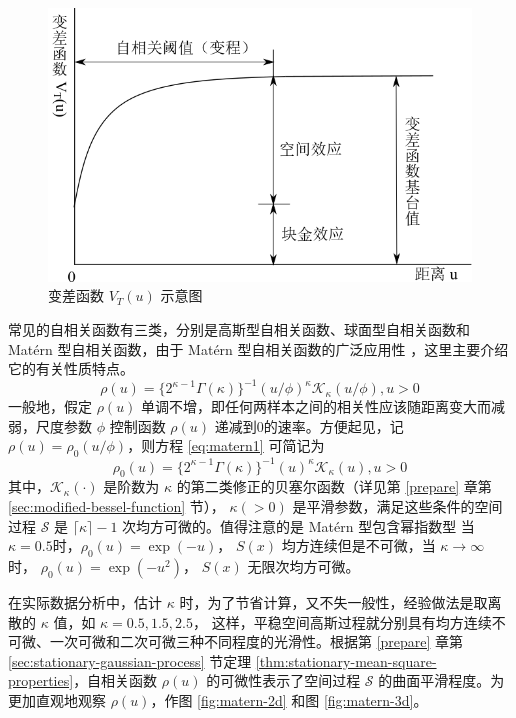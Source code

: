 \documentclass[12pt,a4paper,UTF8,twoside]{book}
\theoremstyle{definition}
\theoremstyle{definition}
\theoremstyle{definition}
\theoremstyle{remark}
\begin{document}
\begin{figure}

{\centering \includegraphics[width=0.7\linewidth]{figures/semi-variance} 

}

\caption{变差函数 $V_{T}(u)$ 示意图}\label{fig:semi-variance}
\end{figure}

常见的自相关函数有三类，分别是高斯型自相关函数、球面型自相关函数和
Matérn 型自相关函数，由于 Matérn 型自相关函数的广泛应用性
\citep{Diggle1998, Diggle2002Childhood, Christensen2004}，这里主要介绍它的有关性质特点。
\begin{equation}
\rho(u)=\{2^{\kappa -1}\Gamma(\kappa)\}^{-1}(u/\phi)^{\kappa}\mathcal{K}_{\kappa}(u/\phi),u > 0 \label{eq:matern1}
\end{equation} \noindent 一般地，假定 \(\rho(u)\)
单调不增，即任何两样本之间的相关性应该随距离变大而减弱，尺度参数
\(\phi\) 控制函数 \(\rho(u)\) 递减到0的速率。方便起见，记
\(\rho(u) = \rho_{0}(u/\phi)\)，则方程 \eqref{eq:matern1} 可简记为
\begin{equation}
\rho_{0}(u)=\{2^{\kappa -1}\Gamma(\kappa)\}^{-1}(u)^{\kappa}\mathcal{K}_{\kappa}(u),u > 0 \label{eq:matern2}
\end{equation} \noindent 其中，\(\mathcal{K}_{\kappa}(\cdot)\) 是阶数为
\(\kappa\) 的第二类修正的贝塞尔函数（详见第 \ref{prepare}
章第\ref{sec:modified-bessel-function} 节）， \(\kappa(>0)\)
是平滑参数，满足这些条件的空间过程 \(\mathcal{S}\) 是
\(\lceil\kappa\rceil-1\) 次均方可微的。值得注意的是 Matérn
型包含幂指数型 \noindent 当
\(\kappa = 0.5\)时，\(\rho_{0}(u) = \exp(-u)\)， \(S(x)\)
均方连续但是不可微，当 \(\kappa \to \infty\) 时，
\(\rho_{0}(u) = \exp(-u^2)\)， \(S(x)\)
无限次均方可微\citep{Diggle2007}。

在实际数据分析中，估计 \(\kappa\)
时，为了节省计算，又不失一般性，经验做法是取离散的 \(\kappa\) 值，如
\(\kappa = 0.5, 1.5, 2.5\)，
这样，平稳空间高斯过程就分别具有均方连续不可微、一次可微和二次可微三种不同程度的光滑性。根据第
\ref{prepare} 章第 \ref{sec:stationary-gaussian-process} 节定理
\ref{thm:stationary-mean-square-properties}，自相关函数 \(\rho(u)\)
的可微性表示了空间过程 \(\mathcal{S}\) 的曲面平滑程度。为更加直观地观察
\(\rho(u)\)，作图 \ref{fig:matern-2d} 和图 \ref{fig:matern-3d}。
\end{document}
